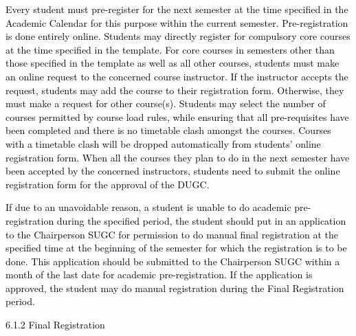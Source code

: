 \documentclass[12pt]{article}
\begin{document}
\vspace{\baselineskip}
\begin{justify}
{\fontsize{9pt}{10.8pt}\selectfont \textcolor[HTML]{00000A}{Every student must pre-register for the next semester at the time specified in the Academic Calendar for this purpose within the current semester. Pre-registration is done entirely online. Students may directly register for compulsory core courses at the time specified in the template. For core courses in semesters other than those specified in the template as well as all other courses, students must make an online request to the concerned course instructor. If the instructor accepts the request, students may add the course to their registration form. Otherwise, they must make a request for other course(s). Students may select the number of courses permitted by course load rules, while ensuring that all pre-requisites have been completed and there is no timetable clash amongst the courses. Courses with a timetable clash will be dropped automatically from students' online registration form. When all the courses they plan to do in the next semester have been accepted by the concerned instructors, students need to submit the online registration form for the approval of the DUGC.}\par}
\end{justify}\par


\vspace{\baselineskip}
\begin{justify}
{\fontsize{10pt}{12.0pt}\selectfont \textcolor[HTML]{00000A}{If due to an unavoidable reason, a student is unable to do academic pre-registration during the specified period, the student should put in an application to the Chairperson SUGC for permission to do manual final registration at the specified time at the beginning of the semester for which the registration is to be done. This application should be submitted to the Chairperson SUGC within a month of the last date for academic pre-registration. If the application is approved, the student may do manual registration during the Final Registration period.}\par}
\end{justify}\par


\vspace{\baselineskip}
{\fontsize{10pt}{12.0pt}\selectfont \textcolor[HTML]{00000A}{6.1.2 Final Registration}\par}\par
\end{document}
